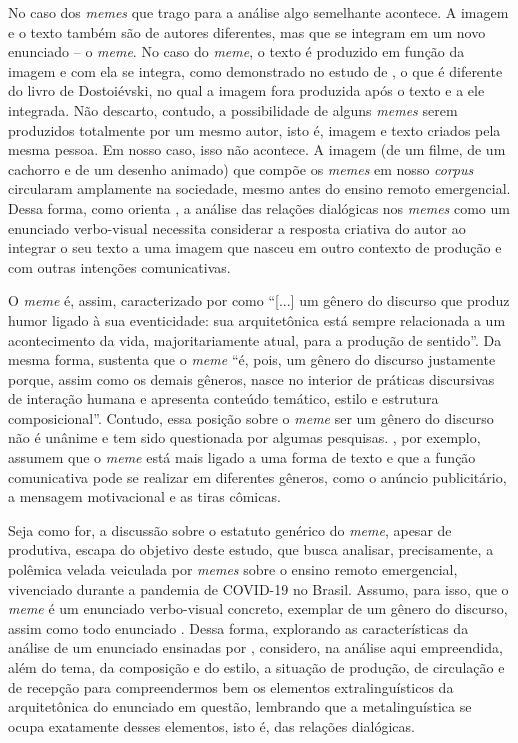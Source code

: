 \documentclass[portuguese]{textolivre}
\begin{document}
No caso dos \textit{memes} que trago para a análise algo semelhante acontece. A imagem e o texto também são de autores diferentes, mas que se integram em um novo enunciado – o \textit{meme}. No caso do \textit{meme}, o texto é produzido em função da imagem e com ela se integra, como demonstrado no estudo de \textcite{lima2022reflexao}, o que é diferente do livro de Dostoiévski, no qual a imagem fora produzida após o texto e a ele integrada. Não descarto, contudo, a possibilidade de alguns \textit{memes} serem produzidos totalmente por um mesmo autor, isto é, imagem e texto criados pela mesma pessoa. Em nosso caso, isso não acontece. A imagem (de um filme, de um cachorro e de um desenho animado) que compõe os \textit{memes} em nosso \textit{corpus} circularam amplamente na sociedade, mesmo antes do ensino remoto emergencial. Dessa forma, como orienta \textcite{lima2022reflexao}, a análise das relações dialógicas nos \textit{memes} como um enunciado verbo-visual necessita considerar a resposta criativa do autor ao integrar o seu texto a uma imagem que nasceu em outro contexto de produção e com outras intenções comunicativas.  
	
O \textit{meme} é, assim, caracterizado por \textcite[p. 189]{lara2020meme} como “[...] um gênero do discurso que produz humor ligado à sua eventicidade: sua arquitetônica está sempre relacionada a um acontecimento da vida, majoritariamente atual, para a produção de sentido”. Da mesma forma, \textcite[p.~348]{silva2016memes} sustenta que o \textit{meme} “é, pois, um gênero do discurso justamente porque, assim como os demais gêneros, nasce no interior de práticas discursivas de interação humana e apresenta conteúdo temático, estilo e estrutura composicional”. Contudo, essa posição sobre o \textit{meme} ser um gênero do discurso não é unânime e tem sido questionada por algumas pesquisas. \textcite{souzajunior2015selfienaurna, limaneto2021representacoes}, por exemplo, assumem que o \textit{meme} está mais ligado a uma forma de texto e que a função comunicativa pode se realizar em diferentes gêneros, como o anúncio publicitário, a mensagem motivacional e as tiras cômicas.

Seja como for, a discussão sobre o estatuto genérico do \textit{meme}, apesar de produtiva, escapa do objetivo deste estudo, que busca analisar, precisamente, a polêmica velada veiculada por \textit{memes} sobre o ensino remoto emergencial, vivenciado durante a pandemia de COVID-19 no Brasil. Assumo, para isso, que o \textit{meme} é um enunciado verbo-visual concreto, exemplar de um gênero do discurso, assim como todo enunciado \cite{bakhtin2016generos}. Dessa forma, explorando as características da análise de um enunciado ensinadas por \textcite{bakhtin2016generos}, considero, na análise aqui empreendida, além do tema, da composição e do estilo, a situação de produção, de circulação e de recepção para compreendermos bem os elementos extralinguísticos da arquitetônica do enunciado em questão, lembrando que a metalinguística se ocupa exatamente desses elementos, isto é, das relações dialógicas.
	
\end{document}
